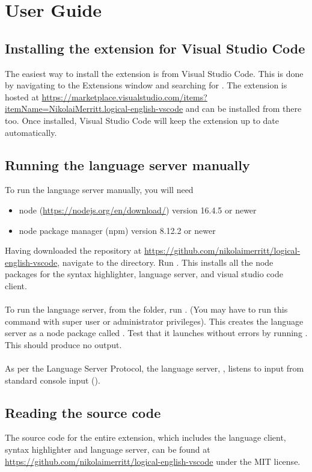 \documentclass[../main.tex]{subfiles}
\begin{document}
\chapter{User Guide}
\section{Installing the extension for Visual Studio Code}
The easiest way to install the extension is from Visual Studio Code. This is done by navigating to the Extensions window and searching for . The extension is hosted at \url{https://marketplace.visualstudio.com/items?itemName=NikolaiMerritt.logical-english-vscode} and can be installed from there too. Once installed, Visual Studio Code will keep the extension up to date automatically.

\section{Running the language server manually}
To run the language server manually, you will need
\begin{itemize}
    \item node (\url{https://nodejs.org/en/download/}) version 16.4.5 or newer
    \item node package manager (npm) version 8.12.2 or newer
\end{itemize}
Having downloaded the repository at \url{https://github.com/nikolaimerritt/logical-english-vscode}, navigate to the  directory. Run . This installs all the node packages for the syntax highlighter, language server, and visual studio code client. 
\\
\\
To run the language server, from the  folder, run . (You may have to run this command with super user or administrator privileges). This creates the language server as a node package called . Test that it launches without errors by running . This should produce no output.
\\
\\
As per the Language Server Protocol, the language server, , listens to input from standard console input ().

\section{Reading the source code}
The source code for the entire extension, which includes the language client, syntax highlighter and language server, can be found at \url{https://github.com/nikolaimerritt/logical-english-vscode} under the MIT license.
\end{document}
